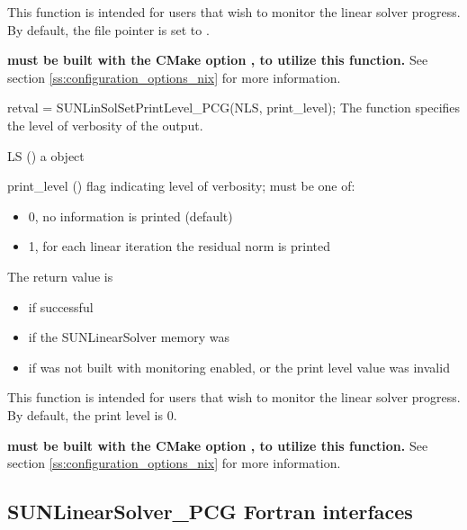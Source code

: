 {
  This function is intended for users that wish to monitor the linear
  solver progress. By default, the file pointer is set to .

  \textbf{{\sundials} must be built with the CMake option
  , to utilize this function.}
  See section \ref{ss:configuration_options_nix} for more information.
}
%
%
{
  retval = SUNLinSolSetPrintLevel\_PCG(NLS, print\_level);
}
{
  The function  specifies the level
  of verbosity of the output.
}
{
  \begin{args}
  \item[LS] ()
    a {\sunnonlinsol} object
  \item[print\_level] () flag indicating level of verbosity;
    must be one of:
    \begin{itemize}
      \item 0, no information is printed (default)
      \item 1, for each linear iteration the residual norm is printed
    \end{itemize}
  \end{args}
}
{
  The return value is
  \begin{itemize}
    \item {} if successful
    \item {} if the SUNLinearSolver memory was 
    \item {} if {\sundials} was not built with monitoring enabled,
      or the print level value was invalid
  \end{itemize}
}
{
  This function is intended for users that wish to monitor the linear
  solver progress. By default, the print level is 0.

  \textbf{{\sundials} must be built with the CMake option
  , to utilize this function.}
  See section \ref{ss:configuration_options_nix} for more information.
}


\subsection{SUNLinearSolver\_PCG Fortran interfaces}
\label{ss:sunlinsol_pcg_fortran}

